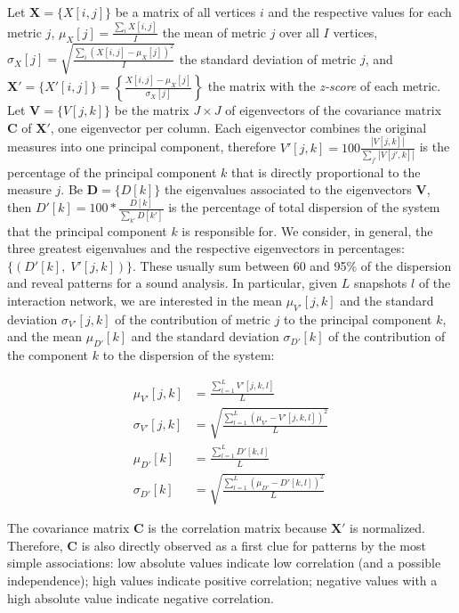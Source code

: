 \documentclass[%
	aip,
	jmp,%
	amsmath,amssymb,
	reprint,%
]{revtex4-1}
\begin{document}
Let $\mathbf{X}=\{X[i,j]\}$ be a matrix of all vertices $i$ and the respective
values for each metric $j$, 
$\mu_X [j]=\frac{\sum_i X[i,j]}{I}$ the mean of metric $j$ over all $I$ vertices, 
$\sigma_X [j]=\sqrt{\frac{\sum_i (X[i,j]-\mu_X [j])^2}{I}}$ the standard deviation of metric $j$,
and $\mathbf{X'}=\{X'[i,j]\}=\left\{\frac{X[i,j]-\mu_X[j]}{\sigma_X[j]}\right\}$ 
the matrix with the \emph{z-score} of each metric. 
Let $\mathbf{V}=\{V[j,k]\}$ be the matrix $J\times J$ of eigenvectors
of the covariance matrix $\mathbf{C}$
of $\mathbf{X'}$, one eigenvector per column.
Each eigenvector combines the original measures into one principal component, therefore
$V'[j,k]=100\frac{|V[j,k]|}{\sum_{j'} |V[j',k]|}$
is the percentage of the principal component $k$
that is directly proportional to the measure $j$.
Be $\mathbf{D}=\{D[k]\}$ the eigenvalues associated to the eigenvectors $\mathbf{V}$,
then $D'[k]=100*\frac{D[k]}{\sum_{k'}D[k']}$
is the percentage of total dispersion of the system that the principal component $k$
is responsible for.
We consider, in general, the three greatest eigenvalues and
the respective eigenvectors in percentages:
$\{(D'[k],\;V'[j,k])\}$.
These usually sum between 60 and 95\% of the dispersion
and reveal patterns for a sound analysis.
In particular, 
given $L$ snapshots $l$ of the interaction network,
we are interested in the mean
$\mu_{V'}[j,k]$
and the standard deviation $\sigma_{V'}[j,k]$ 
of the contribution of metric $j$ to the principal component $k$,
and the mean
$\mu_{D'}[k]$
and the standard deviation 
$\sigma_{D'}[k]$
of the contribution of the component $k$ to the dispersion
of the system:

\begin{align}\label{eq:pca}
\mu_{V'}[j,k]   &=\frac{\sum_{l=1}^L V'[j,k,l]}{L}\nonumber\\
\sigma_{V'}[j,k]&=\sqrt{\frac{\sum_{l=1}^L (\mu_{V'}-V'[j,k,l])^2}{L}}\\\nonumber
\mu_{D'}[k]&=\frac{\sum_{l=1}^L D'[k,l]}{L}\\\nonumber
\sigma_{D'}[k]&=\sqrt{\frac{\sum_{l=1}^L (\mu_{D'}-D'[k,l])^2}{L}}
\end{align}

The covariance matrix 
$\mathbf{C}$ is the correlation matrix because $\mathbf{X'}$ is normalized.
Therefore, $\mathbf{C}$ is also directly observed as a first clue for patterns
by the most simple associations:
low absolute values indicate low correlation (and a possible independence);
high values indicate positive correlation;
negative values with a high absolute value indicate negative correlation.
\end{document}
